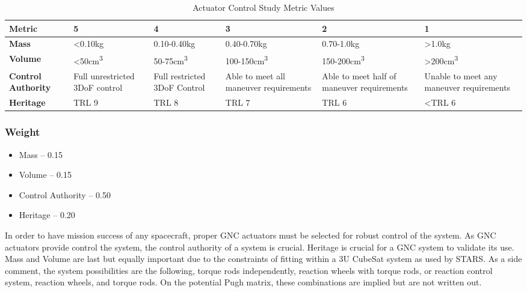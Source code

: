 \begin{table}[H]
\centering
\begin{tabular}{|p{}|p{}|p{}|p{}|p{}|p{}|}
\hline
    \textbf{Metric} & \textbf{5} & \textbf{4} & \textbf{3} & \textbf{2} & \textbf{1}
    \\
\hline
    \textbf{Mass} & <0.10kg & 0.10-0.40kg & 0.40-0.70kg & 0.70-1.0kg & >1.0kg 
    \\   
\hline
    \textbf{Volume} & <50cm\textsuperscript{3} & 50-75cm\textsuperscript{3} & 100-150cm\textsuperscript{3} & 150-200cm\textsuperscript{3} & >200cm\textsuperscript{3} 
    \\    
\hline
    \textbf{Control Authority} & Full unrestricted 3DoF control  & Full restricted 3DoF Control & Able to meet all maneuver requirements & Able to meet half of maneuver requirements & Unable to meet any maneuver requirements  
    \\
\hline
    \textbf{Heritage} & TRL 9 & TRL 8 & TRL 7 & TRL 6 & <TRL 6 
    \\
\hline
\end{tabular}
\caption{Actuator Control Study Metric Values}
\label{tbl:Control_Metric_Scores}
\end{table}
\subsubsection{Weight}
\begin{itemize}
    \item Mass – 0.15
    \item Volume – 0.15
    \item Control Authority – 0.50
    \item Heritage – 0.20
\end{itemize}

In order to have mission success of any spacecraft, proper GNC actuators must be selected for robust control of the system. As GNC actuators provide control the system, the control authority of a system is crucial. Heritage is crucial for a GNC system to validate its use. Mass and Volume are last but equally important due to the constraints of fitting within a 3U CubeSat system as used by STARS. As a side comment, the system possibilities are the following, torque rods independently, reaction wheels with torque rods, or reaction control system, reaction wheels, and torque rods. On the potential Pugh matrix, these combinations are implied but are not written out. 

